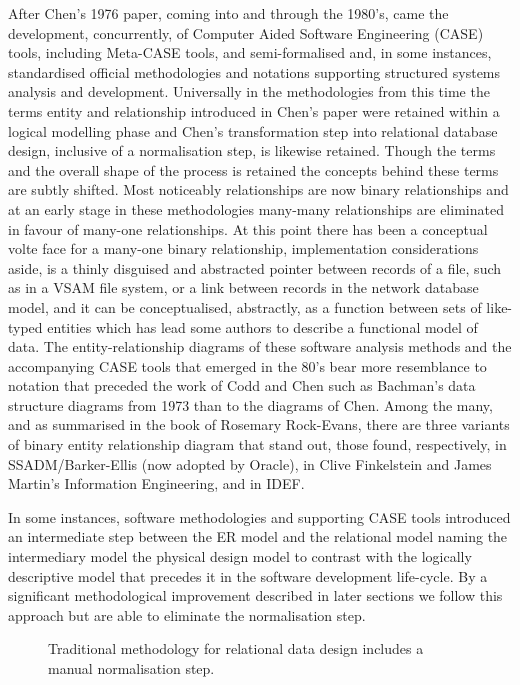 After Chen's 1976 paper, coming into and through the 1980's, came the development, concurrently, of Computer Aided Software Engineering (CASE) tools, including Meta-CASE tools, and semi-formalised and, in some instances, standardised official methodologies and notations supporting structured systems analysis and development. Universally in the methodologies from this time the terms entity and relationship introduced in Chen's paper were retained within a logical modelling phase and Chen's transformation step into relational database design, inclusive of a normalisation step, is likewise retained. Though the terms and the overall shape of the process is retained the concepts behind these terms are subtly shifted. Most noticeably relationships are now binary relationships and at an early stage in these methodologies many-many relationships are eliminated in favour of many-one relationships. At this point there has been a conceptual volte face for a many-one binary relationship, implementation considerations aside, is a thinly disguised and abstracted pointer between records of a file, such as in a VSAM file system, or a link between records in the network database model, and it can be conceptualised, abstractly, as a function between sets of like-typed entities which has lead some authors to describe a functional model of data. The entity-relationship diagrams of these software analysis methods and the accompanying CASE tools that emerged in the 80's bear more resemblance to notation that preceded the work of Codd and Chen such as Bachman's data structure diagrams from 1973 than to the diagrams of Chen. Among the many,  and as summarised in the book of Rosemary Rock-Evans, there are three variants of binary entity relationship diagram that stand out, those found, respectively, in SSADM/Barker-Ellis (now adopted by Oracle), in Clive Finkelstein and James Martin's Information Engineering, and in IDEF.

\mynote In some instances, software methodologies and supporting CASE tools introduced an intermediate step between the ER model and the relational model naming the intermediary model the physical design model to contrast with the logically descriptive model that precedes it in the software development life-cycle. By a significant methodological improvement described in later sections we follow this approach but are able to eliminate the normalisation step.
\begin{figure}[H]

\caption{Traditional methodology for relational data design includes a manual normalisation step.}
\end{figure}

